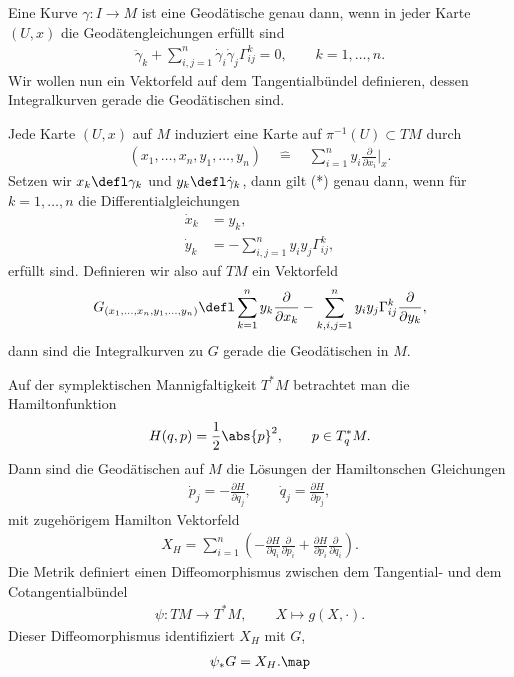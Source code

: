 \documentclass[%
	paper=a5,%
	fleqn,%
	DIV=18,%
	BCOR=0mm,
	fontsize=11pt,
	titlepage=false,%
	bibliography=totoc,
	DIV=18,%
	twoside=true,
	pdftitle=Riemannsche Geometrie,
	pdfauthor=Uwe Semmelmann,
	numbers=noendperiod]%
	{scrbook}
\begin{document}
Eine Kurve $\gamma\colon I\to M$ ist eine Geodätische genau dann, wenn in jeder Karte $(U,x)$ die Geodätengleichungen erfüllt sind
\begin{align*}
\ddot\gamma_{k} + \sum_{i,j=1}^n \dot\gamma_{i}\dot\gamma_{j} \Gamma_{ij}^k = 0,\qquad k=1,\ldots,n.\tag{*}
\end{align*}
Wir wollen nun ein Vektorfeld auf dem Tangentialbündel definieren, dessen Integralkurven gerade die Geodätischen sind.

Jede Karte $(U,x)$ auf $M$ induziert eine Karte auf $\pi^{-1}(U)\subset TM$ durch
\begin{align*}
(x_{1},\ldots,x_{n},y_{1},\ldots,y_{n})\quad \hat{=}\quad \sum_{i=1}^n y_{i}\frac{\partial}{\partial x_{i}}\bigg|_{x}.
\end{align*} 
Setzen wir $x_{k} \defl \gamma_{k}$ und $y_{k}\defl \dot\gamma_{k}$, dann gilt (*) genau dann, wenn für $k=1,\ldots,n$ die Differentialgleichungen
\begin{align*}
\dot x_{k} &= y_{k},\\
\dot y_{k} &= -\sum_{i,j=1}^n y_{i} y_{j} \Gamma_{ij}^k,
\end{align*}
erfüllt sind. Definieren wir also auf $TM$ ein Vektorfeld
\begin{align*}
G_{(x_{1},\ldots,x_{n},y_{1},\ldots,y_{n})} \defl \sum_{k=1}^n y_{k} \frac{\partial}{\partial x_{k}} - 
\sum_{k,i,j=1}^n  y_{i}y_{j}\Gamma_{ij}^k \frac{\partial}{\partial y_{k}},
\end{align*}
dann sind die Integralkurven zu $G$ gerade die Geodätischen in $M$.

\begin{rem}
Auf der symplektischen Mannigfaltigkeit $T^*M$ betrachtet man die Hamiltonfunktion
\begin{align*}
H(q,p) = \frac{1}{2}\abs{p}^2,\qquad p\in T_{q}^*M.
\end{align*}
Dann sind die Geodätischen auf $M$ die Lösungen der Hamiltonschen Gleichungen
\begin{align*}
\dot p_{j} = -\frac{\partial H}{\partial q_{j}},\qquad \dot q_{j} = \frac{\partial H}{\partial p_{j}},
\end{align*}
mit zugehörigem Hamilton Vektorfeld
\begin{align*}
X_{H} = \sum_{i=1}^n \left( -\frac{\partial H}{\partial q_{i}}\frac{\partial}{\partial p_{i}}
+ \frac{\partial H}{\partial p_{i}}\frac{\partial}{\partial q_{i}}\right).
\end{align*}
Die Metrik definiert einen Diffeomorphismus zwischen dem Tangential- und dem Cotangentialbündel
\begin{align*}
\psi : TM\to T^*M,\qquad X\mapsto g(X,\cdot).
\end{align*}
Dieser Diffeomorphismus identifiziert $X_{H}$ mit $G$,
\begin{align*}
\psi_{*}G = X_{H}.\map
\end{align*}
\end{rem}
\end{document}

